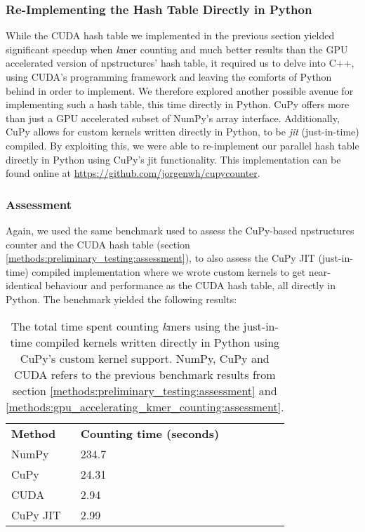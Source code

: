 \subsubsection{Re-Implementing the Hash Table Directly in Python} \label{methods:gpu_accelerating_kmer_counting_jit}
While the CUDA hash table we implemented in the previous section yielded significant speedup when \textit{k}mer counting and much better results than the GPU accelerated version of npstructures' hash table, it required us to delve into C++, using CUDA's programming framework and leaving the comforts of Python behind in order to implement.
We therefore explored another possible avenue for implementing such a hash table, this time directly in Python.
CuPy offers more than just a GPU accelerated subset of NumPy's array interface.
Additionally, CuPy allows for custom kernels written directly in Python, to be \textit{jit} (just-in-time) compiled.
By exploiting this, we were able to re-implement our parallel hash table directly in Python using CuPy's jit functionality.
This implementation can be found online at \url{https://github.com/jorgenwh/cupycounter}.

\subsubsection{Assessment}
Again, we used the same benchmark used to assess the CuPy-based npstructures counter and the CUDA hash table (section \ref{methods:preliminary_testing:assessment}), to also assess the CuPy JIT (just-in-time) compiled implementation where we wrote custom kernels to get near-identical behaviour and performance as the CUDA hash table, all directly in Python.
The benchmark yielded the following results:
\begin{table}[H]
\begin{center}
\begin{tabular}{lllll}
\multicolumn{1}{l|}{\textbf{Method}} & \multicolumn{1}{l}{\textbf{Counting time (seconds)}} &  \\ \cline{1-2}
\multicolumn{1}{l|}{NumPy} & \multicolumn{1}{l}{234.7} &  \\
\multicolumn{1}{l|}{CuPy} & \multicolumn{1}{l}{24.31} &  \\
\multicolumn{1}{l|}{CUDA} & \multicolumn{1}{l}{2.94} &  \\
\multicolumn{1}{l|}{CuPy JIT} & \multicolumn{1}{l}{2.99} &  \\
\end{tabular}
\end{center}
\caption{
  The total time spent counting \textit{k}mers using the just-in-time compiled kernels written directly in Python using CuPy's custom kernel support.
  NumPy, CuPy and CUDA refers to the previous benchmark results from section \ref{methods:preliminary_testing:assessment} and \ref{methods:gpu_accelerating_kmer_counting:assessment}.
}
\label{methods:gpu_accelerating_kmer_counting_jit:tables:benchmark}
\end{table}

